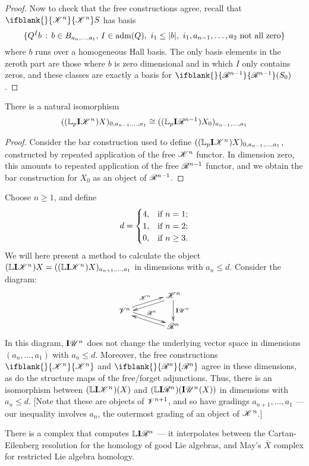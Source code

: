 \documentclass[11pt]{article}
\newcommand{\PRLie}[1]{\scrR^{#1}}%
\newcommand{\LL}[1]{{\scrK}^{#1}}%
\newcommand{\GR}[1]{\scrV^{#1}}%
\newcommand{\nontop}[1]{\scrU^{#1}}%
\newcommand{\admis}[1]{\mathrm{adm}(#1)}%
\newcommand{\Ind}[2][]{\mathbf{I}{#2}_{#1}}%
\newcommand{\forget}{\mathrm{fg}}
\newcommand{\Fr}[2][]{\ifblank{#1}{#2}{#2_{#1}}}
\newcommand{\derived}{\mathbb{L}}
\renewcommand{\Q}{Q}
\begin{document}
\begin{DerivedFunctorsLowDimension}
\begin{proof}
Now to check that the free constructions agree, recall that  $\Fr{\LL{n}}S$ has basis 
\[\{\Q^Ib\,:\,b\in B_{a_{n},\ldots,a_1},\,I\in\admis{\Q},\ i_1\leq|b|,\ i_1,a_{n-1},\ldots,a_2\textup{ not all zero}\}\]
where $b$ runs over a homogeneous Hall basis. The only basis elements in the zeroth part are those where $b$ is zero dimensional and in which $I$ only contains zeros, and these classes are exactly a basis for $\Fr{\PRLie{n-1}}(S_0)$.
\end{proof}
\begin{prop*}
There is a natural isomorphism
\[((\derived_{p}\Ind{\LL{n}})X)_{0,a_{n-1},\ldots,a_1}\cong ((\derived_p\Ind{\PRLie{n-1}})X_0)_{a_{n-1},\ldots,a_1}\]
\begin{proof}
Consider the bar construction used to define $((\derived_{p}\Ind{\LL{n}})X)_{0,a_{n-1},\ldots,a_1}$, constructed by repeated application of the free ${\LL{n}}$ functor. In dimension zero, this amounts to repeated application of the free $\PRLie{n-1}$ functor, and we obtain the bar construction for $X_0$ as an object of $\PRLie{n-1}$.
\end{proof}
\end{prop*}
\begin{shaded}
Choose $n\geq 1$, and define 
\[d=\begin{cases}
4,&\textup{if }n=1;\\
1,&\textup{if }n=2;
\\0,&\textup{if }n\geq3.
\end{cases}
\]
We will here present a method to calculate the object $(\derived\Ind{\LL{n}})X=((\derived\Ind{\LL{n}})X)_{a_{n+1},\ldots,a_1}$ in dimensions with $a_n\leq d$. Consider the diagram:
\[\xymatrix@R=2mm@C=13mm{
&%
\ar[dd]^-{\Ind{\nontop{n}}}
\ar@<.5ex>[dl]%
\LL{n}\\%
\ar@<.5ex>[ur]^-{\LL{n}}
\ar@<.5ex>[dr]^-{\PRLie{n}}
\GR{n}&%
\\%
&%
\PRLie{n}
\ar@<.5ex>[ul]%
}\]
In this diagram, $\Ind{\nontop{n}}$ does not change the underlying vector space in dimensions $(a_n,\ldots,a_1)$ with $a_n\leq d$. Moreover, the free constructions $\Fr{\LL{n}}$ and $\Fr{\PRLie{n}}$ agree in these dimensions, as do the structure maps of the free/forget adjunctions. Thus, there is an isomorphism between $(\derived\Ind{\LL{n}})(X)$ and $(\derived\Ind{\PRLie{n}})(\Ind{\nontop{n}}(X))$ in dimensions with $a_n\leq d$. [Note that these are objects of $\GR{n+1}$, and so have gradings $a_{n+1},\ldots,a_1$ --- our inequality involves $a_n$, the outermost grading of an object of $\LL{n}$.]
\end{shaded}

There is a complex that computes $\derived\Ind{\PRLie{n}}$ --- it interpolates between the Cartan-Eilenberg resolution for the homology of good Lie algebras, and May's $\overline{X}$ complex for  restricted Lie algebra homology.
\end{DerivedFunctorsLowDimension}
\end{document}
